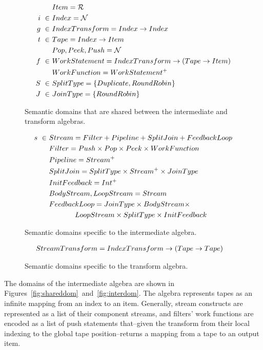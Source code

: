 \begin{figure}[t]
\scriptsize
\begin{align*}
&Item = \mathcal{R} \\
i~\in~&Index = \mathcal{N} \\
g~\in~&IndexTransform = Index \rightarrow Index \\
t~\in~&Tape = Index \rightarrow Item \\
&Pop, Peek, Push = \mathcal{N} \\ 
f~\in~&WorkStatement = IndexTransform \rightarrow (Tape \rightarrow Item) \\ 
&WorkFunction = WorkStatement^{+} \\
S~\in~&SplitType = \{Duplicate, RoundRobin\} \\ 
J~\in~&JoinType = \{RoundRobin\}
\end{align*}
\vspace{-18pt}
\caption{Semantic domains that are shared between the intermediate and
  transform algebras.
\protect\label{fig:shareddom}}
\vspace{-6pt}
\begin{align*}
s~\in~&Stream = Filter + Pipeline + SplitJoin + FeedbackLoop \\
&Filter = Push \times Pop \times Peek \times WorkFunction \\
&Pipeline = Stream^{+} \\
&SplitJoin = SplitType \times Stream^{+} \times JoinType \\
&InitFeedback = Int^{+} \\
&BodyStream, LoopStream = Stream \\
&FeedbackLoop = JoinType \times BodyStream \times \\
& \hspace{0.5in} LoopStream \times SplitType \times InitFeedback
\end{align*}
\vspace{-18pt}
\caption{Semantic domains specific to the intermediate algebra.
\protect\label{fig:interdom}}
\vspace{-6pt}
\begin{align*}
&StreamTransform =  IndexTransform \rightarrow (Tape \rightarrow Tape)
\end{align*}
\vspace{-12pt}
\caption{Semantic domains specific to the transform algebra.
\protect\label{fig:transformdom}}
\vspace{-12pt}
\end{figure}

The domains of the intermediate algebra are shown in
Figures~\ref{fig:shareddom}~and~\ref{fig:interdom}.  The algebra
represents tapes as an infinite mapping from an index to an item.
Generally, stream constructs are represented as a list of their
component streams, and filters' work functions are encoded as a list of
push statements that--given the transform from their local indexing to
the global tape position--returns a mapping from a tape to an output
item.


